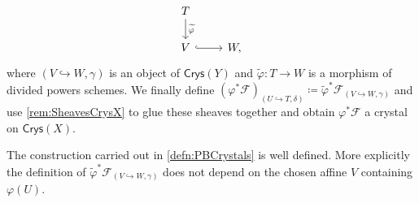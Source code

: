 \begin{defn}
\begin{equation*}
\begin{tikzcd}
		T \arrow[d, "\widetilde{\varphi}", rightarrow] \\
		V \arrow[r, "", hookrightarrow] &
		W
	,\end{tikzcd}
	\end{equation*}
	where $\left(V \hookrightarrow W, \gamma\right)$ is an object of $\mathsf{Crys}(Y)$
	and $\widetilde{\varphi}\colon T \to W$ is a morphism of divided powers schemes.
	We finally define $\left( \varphi^* \mathscr{F} \right)_{\left(U \hookrightarrow T, \delta\right)}
	\coloneqq \widetilde{\varphi}^* \mathscr{F}_{\left(V \hookrightarrow W, \gamma\right)}$
	and use \cref{rem:SheavesCrysX} to glue these sheaves
	together and obtain $\varphi^* \mathscr{F}$ a crystal
	on $\mathsf{Crys}(X)$.
\end{defn}


\begin{prop}[]
	The construction carried out in \cref{defn:PBCrystals} is well defined.
	More explicitly the definition of $\widetilde{\varphi}^* 
	\mathscr{F}_{\left(V \hookrightarrow W, \gamma\right)}$ does not depend
	on the chosen affine $V$ containing $\varphi(U)$.
\end{prop}
